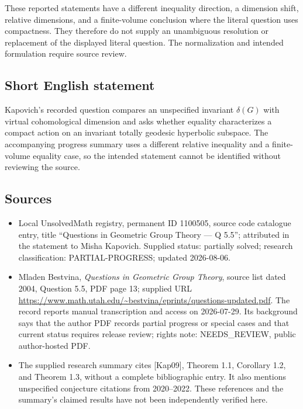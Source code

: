 \documentclass[11pt]{article}
\begin{document}
These reported statements have a different inequality direction, a dimension shift, relative dimensions, and a finite-volume conclusion where the literal question uses compactness. They therefore do not supply an unambiguous resolution or replacement of the displayed literal question. The normalization and intended formulation require source review.
\subsection{Short English statement}
Kapovich's recorded question compares an unspecified invariant $\delta(G)$ with virtual cohomological dimension and asks whether equality characterizes a compact action on an invariant totally geodesic hyperbolic subspace. The accompanying progress summary uses a different relative inequality and a finite-volume equality case, so the intended statement cannot be identified without reviewing the source.
\subsection{Sources}
\begin{itemize}
\item Local UnsolvedMath registry, permanent ID 1100505, source code catalogue entry, title ``Questions in Geometric Group Theory --- Q 5.5''; attributed in the statement to Misha Kapovich. Supplied status: partially solved; research classification: PARTIAL-PROGRESS; updated 2026-08-06.
\item Mladen Bestvina, \emph{Questions in Geometric Group Theory}, source list dated 2004, Question 5.5, PDF page 13; supplied URL \url{https://www.math.utah.edu/~bestvina/eprints/questions-updated.pdf}. The record reports manual transcription and access on 2026-07-29. Its background says that the author PDF records partial progress or special cases and that current status requires release review; rights note: NEEDS\_REVIEW, public author-hosted PDF.
\item The supplied research summary cites [Kap09], Theorem 1.1, Corollary 1.2, and Theorem 1.3, without a complete bibliographic entry. It also mentions unspecified conjecture citations from 2020--2022. These references and the summary's claimed results have not been independently verified here.
\end{itemize}
\end{document}
